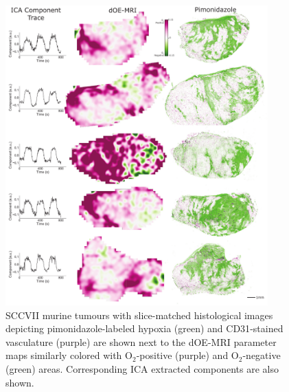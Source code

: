 \begin{figure}[htbp]
   \centering
   \includegraphics[width=0.9\textwidth]{oemri_thesis1/oemri_thesis1-images/fig6_sccvii.pdf} %
   \caption{SCCVII murine tumours with slice-matched histological images depicting pimonidazole-labeled hypoxia (green) and \ac{CD31}-stained vasculature (purple) are shown next to the \ac{dOE-MRI} parameter maps similarly colored with O$_2$-positive (purple) and O$_2$-negative (green) areas. Corresponding \ac{ICA} extracted components are also shown.
   \label{fig_sccvii}}
\end{figure}
